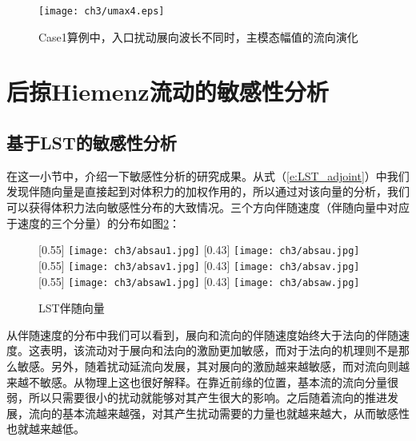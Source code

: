 \begin{figure}
  \centering
  \texttt{[image: ch3/umax4.eps]}\\
  \caption{Case1算例中，入口扰动展向波长不同时，主模态幅值的流向演化}\label{f:findtarget}
\end{figure}
\section{后掠Hiemenz流动的敏感性分析}
\subsection{基于LST的敏感性分析}
在这一小节中，介绍一下敏感性分析的研究成果。从式（\ref{e:LST_adjoint}）中我们发现伴随向量是直接起到对体积力的加权作用的，所以通过对该向量的分析，我们可以获得体积力法向敏感性分布的大致情况。三个方向伴随速度（伴随向量中对应于速度的三个分量）的分布如图\ref{f:LST_ADJOINT}：
\begin{figure}[htb]
  \centering
  [0.55\textwidth]
  {\texttt{[image: ch3/absau1.jpg]}}
  [0.43\textwidth]
  {\texttt{[image: ch3/absau.jpg]}}
  \\\bigskip
  [0.55\textwidth]
  {\texttt{[image: ch3/absav1.jpg]}}
  [0.43\textwidth]
  {\texttt{[image: ch3/absav.jpg]}}
  \\\bigskip
  [0.55\textwidth]
  {\texttt{[image: ch3/absaw1.jpg]}}
  [0.43\textwidth]
  {\texttt{[image: ch3/absaw.jpg]}}
  \caption{LST伴随向量}\label{f:LST_ADJOINT}
\end{figure}
从伴随速度的分布中我们可以看到，展向和流向的伴随速度始终大于法向的伴随速度。这表明，该流动对于展向和法向的激励更加敏感，而对于法向的机理则不是那么敏感。另外，随着扰动延流向发展，其对展向的激励越来越敏感，而对流向则越来越不敏感。从物理上这也很好解释。在靠近前缘的位置，基本流的流向分量很弱，所以只需要很小的扰动就能够对其产生很大的影响。之后随着流向的推进发展，流向的基本流越来越强，对其产生扰动需要的力量也就越来越大，从而敏感性也就越来越低。

